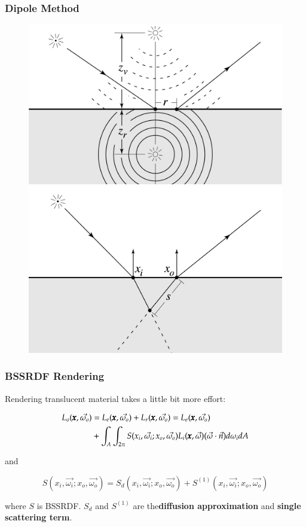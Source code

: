 \begin{frame}
  \frametitle{Dipole Method}
  \begin{figure}[!ht]
    \centering
    \includegraphics[scale=0.15]{di.png}
    \hspace{4mm}
    \includegraphics[scale=0.15]{single.png}
  \end{figure}
\end{frame}

\begin{frame}
  \frametitle{BSSRDF Rendering}
Rendering translucent material takes a little bit more effort:

  \begin{align*}
L_o(\pmb{x}, \vec{\omega_o}) &= L_e(\pmb{x}, \vec{\omega_o}) + L_r(\pmb{x}, \vec{\omega_o}) = L_e(\pmb{x}, \vec{\omega_o})\\
         & + \int_A\int_{2\pi}S(x_i, \vec{\omega_i}; x_o,
           \vec{\omega_o})L_i(\pmb{x}, \vec{\omega})(\vec{\omega}\cdot\vec{n})d\omega_idA
  \end{align*}

and

$$
S(x_i, \vec{\omega_i}; x_o, \vec{\omega_o})  = S_d(x_i,
\vec{\omega_i}; x_o, \vec{\omega_o}) +S^{(1)}(x_i, \vec{\omega_i};
x_o, \vec{\omega_o})
$$

where $S$ is BSSRDF. $S_d$ and $S^{(1)}$ are the{\bf  diffusion approximation} and
{\bf single scattering term}.

\end{frame}


